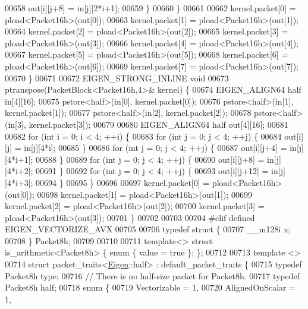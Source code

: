 \begin{DoxyCode}
00658       out[i][j+8] = in[j][2*i+1];
00659     \}
00660   \}
00661 
00662   kernel.packet[0] = pload<Packet16h>(out[0]);
00663   kernel.packet[1] = pload<Packet16h>(out[1]);
00664   kernel.packet[2] = pload<Packet16h>(out[2]);
00665   kernel.packet[3] = pload<Packet16h>(out[3]);
00666   kernel.packet[4] = pload<Packet16h>(out[4]);
00667   kernel.packet[5] = pload<Packet16h>(out[5]);
00668   kernel.packet[6] = pload<Packet16h>(out[6]);
00669   kernel.packet[7] = pload<Packet16h>(out[7]);
00670 \}
00671 
00672 EIGEN\_STRONG\_INLINE \textcolor{keywordtype}{void}
00673 ptranspose(PacketBlock<Packet16h,4>& kernel) \{
00674   EIGEN\_ALIGN64 half in[4][16];
00675   pstore<half>(in[0], kernel.packet[0]);
00676   pstore<half>(in[1], kernel.packet[1]);
00677   pstore<half>(in[2], kernel.packet[2]);
00678   pstore<half>(in[3], kernel.packet[3]);
00679 
00680   EIGEN\_ALIGN64 half out[4][16];
00681 
00682   \textcolor{keywordflow}{for} (\textcolor{keywordtype}{int} i = 0; i < 4; ++i) \{
00683     \textcolor{keywordflow}{for} (\textcolor{keywordtype}{int} j = 0; j < 4; ++j) \{
00684       out[i][j] = in[j][4*i];
00685     \}
00686     \textcolor{keywordflow}{for} (\textcolor{keywordtype}{int} j = 0; j < 4; ++j) \{
00687       out[i][j+4] = in[j][4*i+1];
00688     \}
00689     \textcolor{keywordflow}{for} (\textcolor{keywordtype}{int} j = 0; j < 4; ++j) \{
00690       out[i][j+8] = in[j][4*i+2];
00691     \}
00692     \textcolor{keywordflow}{for} (\textcolor{keywordtype}{int} j = 0; j < 4; ++j) \{
00693       out[i][j+12] = in[j][4*i+3];
00694     \}
00695   \}
00696 
00697   kernel.packet[0] = pload<Packet16h>(out[0]);
00698   kernel.packet[1] = pload<Packet16h>(out[1]);
00699   kernel.packet[2] = pload<Packet16h>(out[2]);
00700   kernel.packet[3] = pload<Packet16h>(out[3]);
00701 \}
00702 
00703 
00704 \textcolor{preprocessor}{#elif defined EIGEN\_VECTORIZE\_AVX}
00705 
00706 \textcolor{keyword}{typedef} \textcolor{keyword}{struct }\{
00707   \_\_m128i x;
00708 \} Packet8h;
00709 
00710 
00711 \textcolor{keyword}{template}<> \textcolor{keyword}{struct }is\_arithmetic<Packet8h> \{ \textcolor{keyword}{enum} \{ value = \textcolor{keyword}{true} \}; \};
00712 
00713 \textcolor{keyword}{template} <>
00714 \textcolor{keyword}{struct }packet\_traits<\hyperlink{namespace_eigen}{Eigen}::half> : default\_packet\_traits \{
00715   \textcolor{keyword}{typedef} Packet8h type;
00716   \textcolor{comment}{// There is no half-size packet for Packet8h.}
00717   \textcolor{keyword}{typedef} Packet8h half;
00718   \textcolor{keyword}{enum} \{
00719     Vectorizable = 1,
00720     AlignedOnScalar = 1,

\end{DoxyCode}
